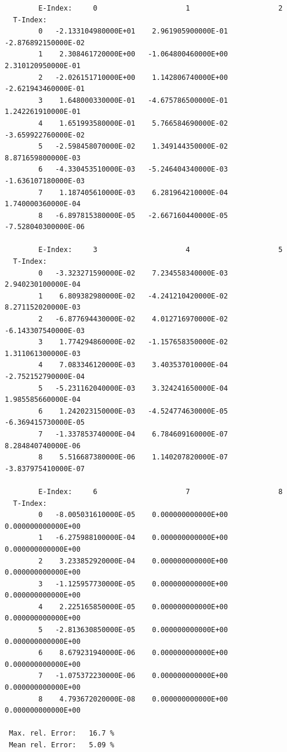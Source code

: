 \documentclass[12pt,dvipdfmx]{article}
\begin{document}
\begin{small}\begin{verbatim}
        E-Index:     0                     1                     2
  T-Index:
        0   -2.133104980000E+01    2.961905900000E-01   -2.876892150000E-02
        1    2.308461720000E+00   -1.064800460000E+00    2.310120950000E-01
        2   -2.026151710000E+00    1.142806740000E+00   -2.621943460000E-01
        3    1.648000330000E-01   -4.675786500000E-01    1.242261910000E-01
        4    1.651993580000E-01    5.766584690000E-02   -3.659922760000E-02
        5   -2.598458070000E-02    1.349144350000E-02    8.871659800000E-03
        6   -4.330453510000E-03   -5.246404340000E-03   -1.636107180000E-03
        7    1.187405610000E-03    6.281964210000E-04    1.740000360000E-04
        8   -6.897815380000E-05   -2.667160440000E-05   -7.528040300000E-06

        E-Index:     3                     4                     5
  T-Index:
        0   -3.323271590000E-02    7.234558340000E-03    2.940230100000E-04
        1    6.809382980000E-02   -4.241210420000E-02    8.271152020000E-03
        2   -6.877694430000E-02    4.012716970000E-02   -6.143307540000E-03
        3    1.774294860000E-02   -1.157658350000E-02    1.311061300000E-03
        4    7.083346120000E-03    3.403537010000E-04   -2.752152790000E-04
        5   -5.231162040000E-03    3.324241650000E-04    1.985585660000E-04
        6    1.242023150000E-03   -4.524774630000E-05   -6.369415730000E-05
        7   -1.337853740000E-04    6.784609160000E-07    8.284840740000E-06
        8    5.516687380000E-06    1.140207820000E-07   -3.837975410000E-07

        E-Index:     6                     7                     8
  T-Index:
        0   -8.005031610000E-05    0.000000000000E+00    0.000000000000E+00
        1   -6.275988100000E-04    0.000000000000E+00    0.000000000000E+00
        2    3.233852920000E-04    0.000000000000E+00    0.000000000000E+00
        3   -1.125957730000E-05    0.000000000000E+00    0.000000000000E+00
        4    2.225165850000E-05    0.000000000000E+00    0.000000000000E+00
        5   -2.813630850000E-05    0.000000000000E+00    0.000000000000E+00
        6    8.679231940000E-06    0.000000000000E+00    0.000000000000E+00
        7   -1.075372230000E-06    0.000000000000E+00    0.000000000000E+00
        8    4.793672020000E-08    0.000000000000E+00    0.000000000000E+00

 Max. rel. Error:   16.7 %
 Mean rel. Error:   5.09 %
\end{verbatim}\end{small}
\end{document}
